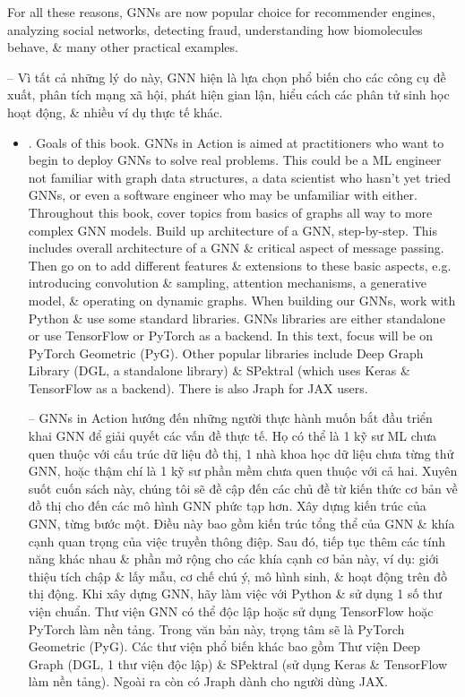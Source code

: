 \documentclass{article}
\begin{document}
\begin{itemize}
    For all these reasons, GNNs are now popular choice for recommender engines, analyzing social networks, detecting fraud, understanding how biomolecules behave, \& many other practical examples.

    -- Vì tất cả những lý do này, GNN hiện là lựa chọn phổ biến cho các công cụ đề xuất, phân tích mạng xã hội, phát hiện gian lận, hiểu cách các phân tử sinh học hoạt động, \& nhiều ví dụ thực tế khác.
    \begin{itemize}
        \item {. Goals of this book.} GNNs in Action is aimed at practitioners who want to begin to deploy GNNs to solve real problems. This could be a ML engineer not familiar with graph data structures, a data scientist who hasn't yet tried GNNs, or even a software engineer who may be unfamiliar with either. Throughout this book, cover topics from basics of graphs all way to more complex GNN models. Build up architecture of a GNN, step-by-step. This includes overall architecture of a GNN \& critical aspect of message passing. Then go on to add different features \& extensions to these basic aspects, e.g. introducing convolution \& sampling, attention mechanisms, a generative model, \& operating on dynamic graphs. When building our GNNs, work with Python \& use some standard libraries. GNNs libraries are either standalone or use TensorFlow or PyTorch as a backend. In this text, focus will be on PyTorch Geometric (PyG). Other popular libraries include Deep Graph Library (DGL, a standalone library) \& SPektral (which uses Keras \& TensorFlow as a backend). There is also Jraph for JAX users.

        -- GNNs in Action hướng đến những người thực hành muốn bắt đầu triển khai GNN để giải quyết các vấn đề thực tế. Họ có thể là 1 kỹ sư ML chưa quen thuộc với cấu trúc dữ liệu đồ thị, 1 nhà khoa học dữ liệu chưa từng thử GNN, hoặc thậm chí là 1 kỹ sư phần mềm chưa quen thuộc với cả hai. Xuyên suốt cuốn sách này, chúng tôi sẽ đề cập đến các chủ đề từ kiến thức cơ bản về đồ thị cho đến các mô hình GNN phức tạp hơn. Xây dựng kiến trúc của GNN, từng bước một. Điều này bao gồm kiến trúc tổng thể của GNN \& khía cạnh quan trọng của việc truyền thông điệp. Sau đó, tiếp tục thêm các tính năng khác nhau \& phần mở rộng cho các khía cạnh cơ bản này, ví dụ: giới thiệu tích chập \& lấy mẫu, cơ chế chú ý, mô hình sinh, \& hoạt động trên đồ thị động. Khi xây dựng GNN, hãy làm việc với Python \& sử dụng 1 số thư viện chuẩn. Thư viện GNN có thể độc lập hoặc sử dụng TensorFlow hoặc PyTorch làm nền tảng. Trong văn bản này, trọng tâm sẽ là PyTorch Geometric (PyG). Các thư viện phổ biến khác bao gồm Thư viện Deep Graph (DGL, 1 thư viện độc lập) \& SPektral (sử dụng Keras \& TensorFlow làm nền tảng). Ngoài ra còn có Jraph dành cho người dùng JAX.


\end{itemize}
\end{itemize}
\end{document}
